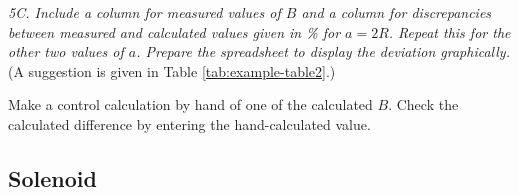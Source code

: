 \documentclass[../Elmag-labhefte-2020.tex]{subfiles}
\begin{document}
\emph{ 5C. Include a column for measured values   of $B$ and a column for discrepancies between measured and calculated values   given in \si{\percent} for $a = 2R$. Repeat this for the other two values   of $a$. Prepare the spreadsheet to display the deviation graphically.} (A suggestion is given in Table \ref{tab:example-table2}.)

Make a control calculation by hand of one of the calculated $B$. Check the calculated difference by entering the hand-calculated value.

\subsection{Solenoid \label{ch.magnetfelt.solenoide}}
\end{document}
